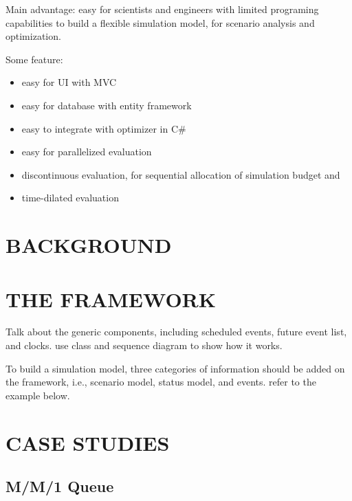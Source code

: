 \documentclass{wscpaperproc}
\theoremstyle{wsc}
\begin{document}

Main advantage: easy for scientists and engineers with limited programing capabilities to build a flexible simulation model, for scenario analysis and optimization.

Some feature:

\begin{itemize}
	\item easy for UI with MVC
	\item easy for database with entity framework
	\item easy to integrate with optimizer in C\#
	\item easy for parallelized evaluation
	\item discontinuous evaluation, for sequential allocation of simulation budget and
	\item time-dilated evaluation
\end{itemize}

\section{BACKGROUND}






\section{THE FRAMEWORK}

Talk about the generic components, including scheduled events, future event list, and clocks.
use class and sequence diagram to show how it works.

To build a simulation model, three categories of information should be added on the framework, i.e., scenario model, status model, and events.
refer to the example below.

\section{CASE STUDIES}

\subsection{M/M/1 Queue}
\end{document}
